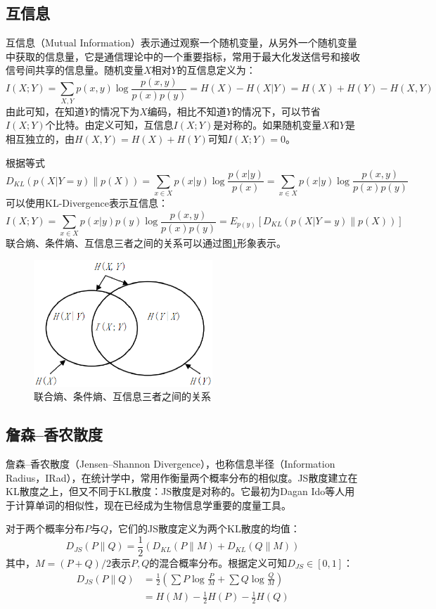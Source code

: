 \subsection{互信息}
互信息（Mutual Information）表示通过观察一个随机变量，从另外一个随机变量中获取的信息量，它是通信理论中的一个重要指标，常用于最大化发送信号和接收信号间共享的信息量。随机变量$X$相对$Y$的互信息定义为：
\begin{equation}\label{eq:mutualinfo}
  I(X;Y) = \sum_{X,Y}{p(x,y)\log\frac{p(x,y)}{p(x)p(y)}} = H(X) - H(X|Y) = H(X) + H(Y) - H(X,Y)
\end{equation}
由此可知，在知道$Y$的情况下为$X$编码，相比不知道$Y$的情况下，可以节省$I(X;Y)$个比特。由定义可知，互信息$I(X;Y)$是对称的。如果随机变量$X$和$Y$是相互独立的，由$H(X,Y)=H(X) + H(Y)$可知$I(X;Y)=0$。

根据等式
\[
 D_{KL}(p(X|Y=y)\| p(X)) = \sum_{x\in X}{p(x|y)\log\frac{p(x|y)}{p(x)}}=\sum_{x\in X}{p(x|y)\log\frac{p(x,y)}{p(x)p(y)}}
\]
可以使用KL-Divergence表示互信息：
\[
    I(X;Y) = \sum_{x\in X}{p(x|y)p(y)\log\frac{p(x,y)}{p(x)p(y)}} = E_{p(y)}[D_{KL}(p(X|Y=y)\|p(X))]
\]
联合熵、条件熵、互信息三者之间的关系可以通过图\ref{fig:entropy}形象表示。
\begin{figure}[ht]
  \centering
  \includegraphics[width=0.6\textwidth]{figures/entropy.eps}
  \caption{联合熵、条件熵、互信息三者之间的关系}\label{fig:entropy}
\end{figure}

\subsection{詹森--香农散度}
詹森--香农散度（Jensen--Shannon Divergence），也称信息半径（Information Radius，IRad），在统计学中，常用作衡量两个概率分布的相似度。JS散度建立在KL散度之上，但又不同于KL散度：JS散度是对称的。它最初为Dagan Ido等人用于计算单词的相似性\cite{dagan1999similarity}，现在已经成为生物信息学重要的度量工具。

对于两个概率分布$P$与$Q$，它们的JS散度定义为两个KL散度的均值：
\begin{equation}
  D_{JS}(P\| Q) = \frac{1}{2}(D_{KL}(P\| M) + D_{KL}(Q\| M))
\end{equation}
其中，$M = (P + Q)/2$表示$P,Q$的混合概率分布。根据定义可知$D_{JS} \in [0,1]$：
\begin{equation}
\begin{array}{ll}
  D_{JS}(P\| Q) & = \frac{1}{2}(\sum P\log{\frac{P}{M}} + \sum Q\log{\frac{Q}{M}})\\
   & = H(M) - \frac{1}{2}H(P) - \frac{1}{2}H(Q)
\end{array}
\end{equation}


